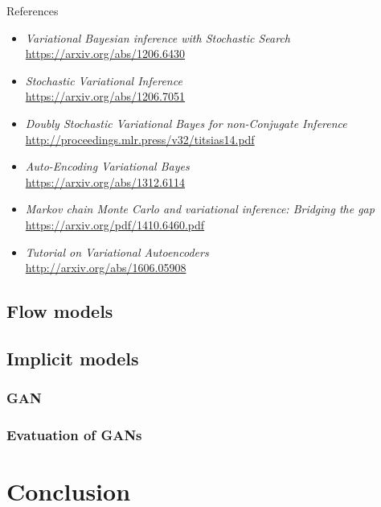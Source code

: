 \documentclass{beamer}
\begin{document}
\begin{frame}{References}
{\scriptsize
\begin{itemize}
    \item \textit{Variational Bayesian inference with Stochastic Search} \\
	\href{https://arxiv.org/abs/1206.6430}{https://arxiv.org/abs/1206.6430}

    \item \textit{Stochastic Variational Inference} \\
	\href{https://arxiv.org/abs/1206.7051}{https://arxiv.org/abs/1206.7051}

    \item \textit{Doubly Stochastic Variational Bayes for non-Conjugate Inference} \\
	\href{http://proceedings.mlr.press/v32/titsias14.pdf}{http://proceedings.mlr.press/v32/titsias14.pdf}

    \item \textit{Auto-Encoding Variational Bayes} \\
	\href{https://arxiv.org/abs/1312.6114}{https://arxiv.org/abs/1312.6114}
    
    \item \textit{Markov chain Monte Carlo and variational inference: Bridging the gap} \\
	\href{https://arxiv.org/pdf/1410.6460.pdf}{https://arxiv.org/pdf/1410.6460.pdf}
	
    \item \textit{Tutorial on Variational Autoencoders} \\
	\href{http://arxiv.org/abs/1606.05908}{http://arxiv.org/abs/1606.05908}
\end{itemize}
}
\end{frame}
\subsection{Flow models}
\subsection{Implicit models}
\subsubsection{GAN}
\subsubsection{Evatuation of GANs}
\section{Conclusion}
\end{document}
